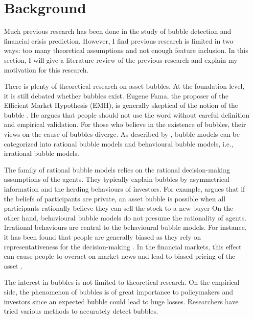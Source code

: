 \documentclass[12pt, man, a4paper, floatsintext]{apa7}
\begin{document}
    \section{Background}

Much previous research has been done in the study of bubble detection and financial crisis prediction. However, I find previous research is limited in two ways: too many theoretical assumptions and not enough feature inclusion. In this section, I will give a literature review of the previous research and explain my motivation for this research.

There is plenty of theoretical research on asset bubbles. At the foundation level, it is still debated whether bubbles exist. Eugene Fama, the proposer of the Efficient Market Hypothesis (EMH), is generally skeptical of the notion of the bubble \parencite{fama2014}. He argues that people should not use the word  without careful definition and empirical validation. For those who believe in the existence of bubbles, their views on the cause of bubbles diverge. As described by \textcite{Wckl2019Survey}, bubble models can be categorized into rational bubble models and behavioural bubble models, i.e., irrational bubble models. 

The family of rational bubble models relies on the rational decision-making assumptions of the agents. They typically explain bubbles by asymmetrical information and the herding behaviours of investors. For example, \textcite{allen1993} argues that if the beliefs of participants are private, an asset bubble is possible when all participants rationally believe they can sell the stock to a new buyer  On the other hand, behavioural bubble models do not presume the rationality of agents. Irrational behaviours are central to the behavioural bubble models. For instance, it has been found that people are generally biased as they rely on representativeness for the decision-making \parencite{TVERSKY1973207}. In the financial markets, this effect can cause people to overact on market news and lead to biased pricing of the asset \parencite{psychology}. 

The interest in bubbles is not limited to theoretical research. On the empirical side, the phenomenon of bubbles is of great importance to policymakers and investors since an expected bubble could lead to huge losses. Researchers have tried various methods to accurately detect bubbles.
\end{document}
